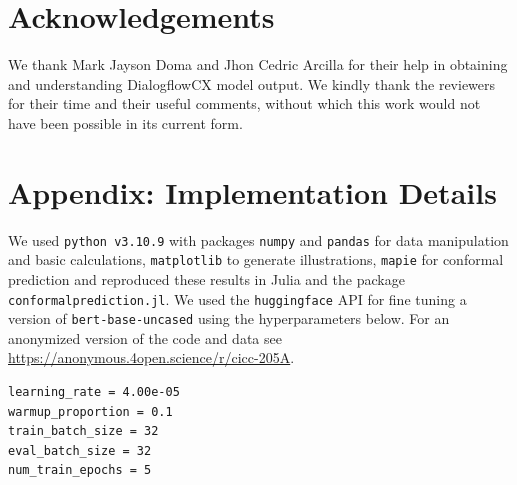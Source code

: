 \documentclass[11pt]{article}
\newcommand{\code}[1]{\colorbox{light-gray}{\texttt{#1}}}
\begin{document}
\section*{Acknowledgements}
We thank Mark Jayson Doma and Jhon Cedric Arcilla for their help in obtaining and understanding DialogflowCX model output. We kindly thank the reviewers for their time and their useful comments, without which this work would not have been possible in its current form.


% 

\newpage
\clearpage

\appendix
\onecolumn
\section{Appendix: Implementation Details}
\label{sec:appendix_implementation_details}
We used \code{python v3.10.9} with packages \code{numpy} and \code{pandas} for data manipulation and basic calculations, \code{matplotlib} to generate illustrations, \code{mapie} for conformal prediction and reproduced these results in Julia and the package \code{conformalprediction.jl}. We used the \code{huggingface} API for fine tuning a version of \code{bert-base-uncased} using the hyperparameters below. For an anonymized version of the code and data see \url{https://anonymous.4open.science/r/cicc-205A}.

\begin{lstlisting}
learning_rate = 4.00e-05
warmup_proportion = 0.1
train_batch_size = 32
eval_batch_size = 32
num_train_epochs = 5
\end{lstlisting}
\end{document}
